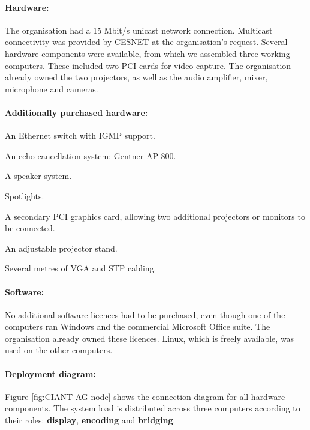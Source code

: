 \paragraph*{Hardware:}
The organisation had a 15 Mbit/s unicast network connection. Multicast connectivity was provided by CESNET at the organisation's request. Several hardware components were available, from which we assembled three working computers. These included two PCI cards for video capture. The organisation already owned the two projectors, as well as the audio amplifier, mixer, microphone and cameras.

\paragraph*{Additionally purchased hardware:}
\begin{paklist}
\item An Ethernet switch with IGMP support.
\item An echo-cancellation system: Gentner AP-800.
\item A speaker system.
\item Spotlights.
\item A secondary PCI graphics card, allowing two additional projectors or monitors to be connected.
\item An adjustable projector stand.
\item Several metres of VGA and STP cabling.
\end{paklist}

\paragraph*{Software:}
No additional software licences had to be purchased, even though one of the computers ran Windows and the commercial Microsoft Office suite. The organisation already owned these licences. Linux, which is freely available, was used on the other computers.

\paragraph*{Deployment diagram:}
Figure \ref{fig:CIANT-AG-node} shows the connection diagram for all hardware components. The system load is distributed across three computers according to their roles: \textbf{display}, \textbf{encoding} and \textbf{bridging}.

